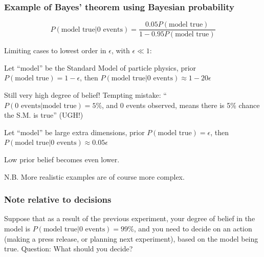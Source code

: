 \documentclass[9pt]{beamer}
\begin{document}
\begin{frame}
 \frametitle{Example  of Bayes' theorem using Bayesian probability}
 
 $$P(\text{model true} | \text{0 events}) = \frac{0.05  P(\text{model true})}{1 - 0.95 P(\text{model true})}$$
 
Limiting cases to lowest order in $\epsilon$, with $\epsilon \ll 1$:

\vspace{10pt}

Let ``model'' be the Standard Model of particle physics, prior $P(\text{model true}) = 1 - \epsilon$, then $P(\text{model true} | \text{0 events}) \approx 1 - 20\epsilon$

Still very high degree of belief! Tempting mistake: ``$P(\text{0 events} | \text{model true}) = 5\%$, and 0 events observed, means there is 5\% chance the S.M. is true'' (UGH!)

\vspace{10pt}

Let ``model'' be large extra dimensions, prior $P(\text{model true}) = \epsilon$, then $P(\text{model true} | \text{0 events}) \approx 0.05 \epsilon$

Low prior belief becomes even lower.

\vspace{10pt}

N.B. More realistic examples are of course more complex.

\end{frame}

\begin{frame}
 \frametitle{Note relative to decisions}
 
 Suppose that as a result of the previous experiment, your degree
of belief in the model is $P(\text{model true} | \text{0 events}) = 99\%$, and you
need to decide on an action (making a press release, or planning
next experiment), based on the model being true.
Question: What should you decide?

\vspace{10pt}


\end{frame}
\end{document}
